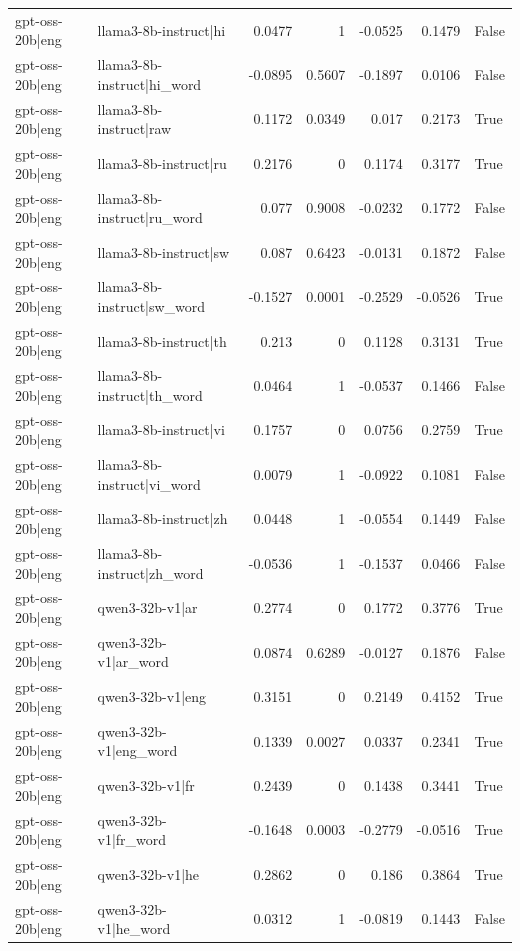 \begin{table}
\begin{tabular}{l l r r r r l}
gpt-oss-20b|eng & llama3-8b-instruct|hi & 0.0477 & 1 & -0.0525 & 0.1479 & False \\
gpt-oss-20b|eng & llama3-8b-instruct|hi_word & -0.0895 & 0.5607 & -0.1897 & 0.0106 & False \\
gpt-oss-20b|eng & llama3-8b-instruct|raw & 0.1172 & 0.0349 & 0.017 & 0.2173 & True \\
gpt-oss-20b|eng & llama3-8b-instruct|ru & 0.2176 & 0 & 0.1174 & 0.3177 & True \\
gpt-oss-20b|eng & llama3-8b-instruct|ru_word & 0.077 & 0.9008 & -0.0232 & 0.1772 & False \\
gpt-oss-20b|eng & llama3-8b-instruct|sw & 0.087 & 0.6423 & -0.0131 & 0.1872 & False \\
gpt-oss-20b|eng & llama3-8b-instruct|sw_word & -0.1527 & 0.0001 & -0.2529 & -0.0526 & True \\
gpt-oss-20b|eng & llama3-8b-instruct|th & 0.213 & 0 & 0.1128 & 0.3131 & True \\
gpt-oss-20b|eng & llama3-8b-instruct|th_word & 0.0464 & 1 & -0.0537 & 0.1466 & False \\
gpt-oss-20b|eng & llama3-8b-instruct|vi & 0.1757 & 0 & 0.0756 & 0.2759 & True \\
gpt-oss-20b|eng & llama3-8b-instruct|vi_word & 0.0079 & 1 & -0.0922 & 0.1081 & False \\
gpt-oss-20b|eng & llama3-8b-instruct|zh & 0.0448 & 1 & -0.0554 & 0.1449 & False \\
gpt-oss-20b|eng & llama3-8b-instruct|zh_word & -0.0536 & 1 & -0.1537 & 0.0466 & False \\
gpt-oss-20b|eng & qwen3-32b-v1|ar & 0.2774 & 0 & 0.1772 & 0.3776 & True \\
gpt-oss-20b|eng & qwen3-32b-v1|ar_word & 0.0874 & 0.6289 & -0.0127 & 0.1876 & False \\
gpt-oss-20b|eng & qwen3-32b-v1|eng & 0.3151 & 0 & 0.2149 & 0.4152 & True \\
gpt-oss-20b|eng & qwen3-32b-v1|eng_word & 0.1339 & 0.0027 & 0.0337 & 0.2341 & True \\
gpt-oss-20b|eng & qwen3-32b-v1|fr & 0.2439 & 0 & 0.1438 & 0.3441 & True \\
gpt-oss-20b|eng & qwen3-32b-v1|fr_word & -0.1648 & 0.0003 & -0.2779 & -0.0516 & True \\
gpt-oss-20b|eng & qwen3-32b-v1|he & 0.2862 & 0 & 0.186 & 0.3864 & True \\
gpt-oss-20b|eng & qwen3-32b-v1|he_word & 0.0312 & 1 & -0.0819 & 0.1443 & False \\

\end{tabular}
\end{table}
